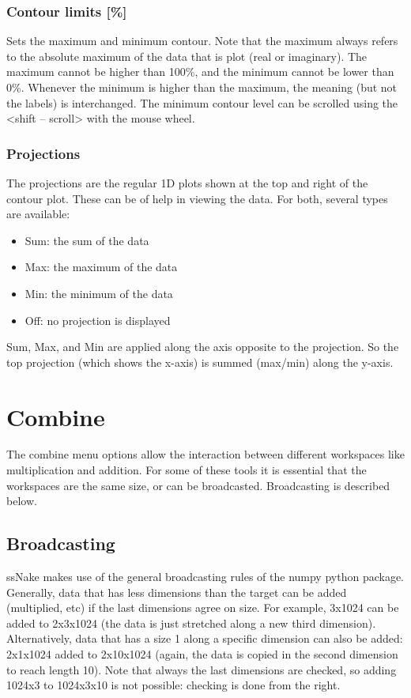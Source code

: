 \documentclass[11pt,a4paper]{article}
\begin{document}
\subsubsection*{Contour limits [\%]}
Sets the maximum and minimum contour. Note that the maximum always refers to the absolute maximum of the data that is plot (real or imaginary).
The maximum cannot be higher than 100\%, and the minimum cannot be lower than 0\%. Whenever the minimum is higher than the maximum, 
the meaning (but not the labels) is interchanged. The minimum contour level can be scrolled using the <shift -- scroll> with the mouse wheel.

\subsubsection*{Projections}
The projections are the regular 1D plots shown at the top and right of the contour plot. These can be of help in viewing the data.
For both, several types are available:
\begin{itemize}
  \item Sum: the sum of the data 
  \item Max: the maximum of the data
  \item Min: the minimum of the data
  \item Off: no projection is displayed
\end{itemize}
Sum, Max, and Min are applied along the axis opposite to the projection. So the top projection (which shows the x-axis) is summed (max/min) along the y-axis.




\section{Combine}
The combine menu options allow the interaction between different workspaces like multiplication and addition. For some of these tools it is essential that the workspaces
are the same size, or can be broadcasted. Broadcasting is described below.

\subsection{Broadcasting}
ssNake makes use of the general broadcasting rules of the numpy python package. Generally, data that has less dimensions than the target can be added (multiplied, etc)
if the last dimensions agree on size. For example, 3x1024 can be added to 2x3x1024 (the data is just stretched along a new third dimension). Alternatively, data that has a size 1
along a specific dimension can also be added: 2x1x1024 added to 2x10x1024 (again, the data is copied in the second dimension to reach length 10).
Note that always the last dimensions are checked, so adding 1024x3 to 1024x3x10 is not possible: checking is done from the right. 
\end{document}
